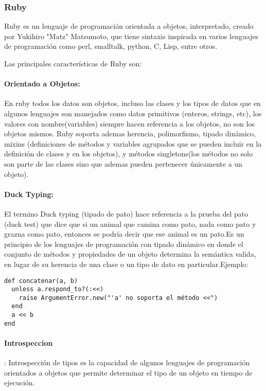 \subsubsection*{Ruby \cite{ruby_lang} }
\label{tec:ruby}

Ruby es un lenguaje de programación orientada a objetos, interpretado, creado por Yukihiro "Matz" Matsumoto, que tiene sintaxis inspirada en varios lenguajes de programación como perl, smalltalk, python, C, Lisp, entre otros.

Las principales características de Ruby son:

\paragraph{Orientado a Objetos:}
En ruby todos los datos son objetos, incluso las clases y los tipos de datos que en algunos lenguajes son manejados como datos primitivos (enteros, strings, etc), los valores con nombre(variables) siempre hacen referencia a los objetos, no son los objetos mismos. \newline Ruby soporta ademas herencia, polimorfismo, tipado dinámico, mixins (definiciones de métodos y variables agrupados que se pueden incluir en la definición de clases y en los objetos), y métodos singletons(los métodos no solo son parte de las clases sino que ademas pueden pertenecer únicamente a un objeto).

\paragraph{Duck Typing:}
El termino Duck typing (tipado de pato) hace referencia a la prueba del pato (duck test) que dice que si un animal que camina como pato, nada como pato y grazna como pato, entonces se podría decir que ese animal es un pato.\newline Es un principio de los lenguajes de programación con tipado dinámico en donde el conjunto de métodos y propiedades de un objeto determina la semántica valida, en lugar de su herencia de una clase o un tipo de dato en particular.\newline Ejemplo:

\begin{verbatim}
def concatenar(a, b)
  unless a.respond_to?(:<<)
    raise ArgumentError.new("'a' no soporta el método <<")
  end
  a << b
end
\end{verbatim}

\paragraph{Introspeccion}:
Introspección de tipos es la capacidad de algunos lenguajes de programación orientados a objetos que permite determinar el tipo de un objeto en tiempo de ejecución.

